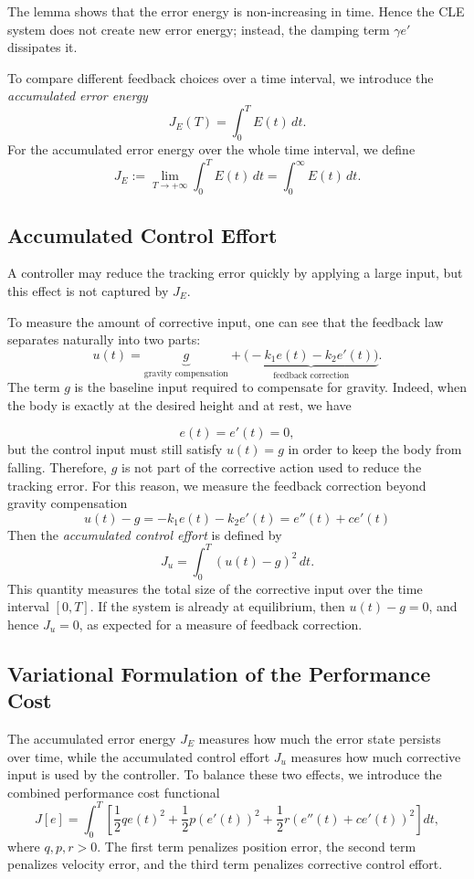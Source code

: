 ﻿\documentclass[12pt]{article}
\begin{document}
The lemma shows that the error energy is non-increasing in time. Hence the CLE system does not create new error energy; instead, the damping term $\gamma e'$ dissipates it.

To compare different feedback choices over a time interval, we introduce the \textit{accumulated error energy}
\[
 J_E(T) = \int_0^T E(t)\, dt.
\]
For the accumulated error energy over the whole time interval, we define
\[
 J_E := \lim_{T \to + \infty} \int_0^T E(t)\, dt = \int_0^\infty E(t)\, dt.
\]
\subsection{Accumulated Control Effort}
A controller may reduce the tracking error quickly by applying a large input, but this effect is not captured by $J_E$.

To measure the amount of corrective input, one can see that the feedback law separates naturally into two parts:
\[
 u(t) = \underbrace{g}_{\text{gravity compensation}} + \underbrace{\bigl(-k_1e(t) - k_2e'(t)\bigr)}_{\text{feedback correction}}.
\]
The term $g$ is the baseline input required to compensate for gravity. Indeed, when the body is exactly at the desired height and at rest, we have

\[
 e(t) = e'(t) = 0,
\]
but the control input must still satisfy $u(t) = g$ in order to keep the body from falling. Therefore, $g$ is not part of the corrective action used to reduce the tracking error. For this reason, we measure the feedback correction beyond gravity compensation
\[
 u(t) - g = -k_1e(t) - k_2e'(t) = e''(t) + ce'(t)
\]
Then the \textit{accumulated control effort} is defined by
\[
 J_u = \int_0^T (u(t) - g)^2\, dt.
\]
This quantity measures the total size of the corrective input over the time interval $[0, T]$. If the system is already at equilibrium, then $u(t) - g = 0$, and hence $J_u = 0$, as expected for a measure of feedback correction.
\subsection{Variational Formulation of the Performance Cost}\label{VF}


The accumulated error energy $J_E$ measures how much the error state persists over time, while the accumulated control effort $J_u$ measures how much corrective input is used by the controller. To balance these two effects, we introduce the combined performance cost functional 
\[
 \boxed{ J[e] = \int_0^T \left[ \frac{1}{2}q e(t)^2 + \frac{1}{2}p(e'(t))^2 + \frac{1}{2}r(e''(t) + ce'(t))^2 \right]dt,}
\]
where $q, p, r > 0$. The first term penalizes position error, the second term penalizes velocity error, and the third term penalizes corrective control effort.
\end{document}
